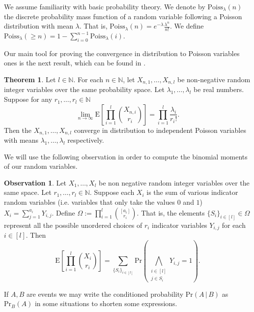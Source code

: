\documentclass[12pt,notitlepage,a4paper]{article}
\theoremstyle{definition}
\newtheorem{theorem}{Theorem}[section]
\newtheorem{obs}{Observation}[section]
\newcommand{\N}{\mathbb{N}}
\newcommand{\Ln}{\lim\limits_{n\to \infty}}
\begin{document}
We assume familiarity with basic probability theory. 
We denote by $\mathrm{Poiss}_\lambda(n)$ the discrete probability mass
function of a random variable following a Poisson distribution with
mean $\lambda$. That is, $\mathrm{Poiss}_\lambda(n)=e^{-\lambda}\frac{\lambda^n}{n!}$.
We define $\mathrm{Poiss}_\lambda(\geq n)=1 - \sum_{i=0}^{n-1} \mathrm{Poiss}_\lambda(i)$. \par

Our main tool for proving the convergence in distribution 
to Poisson variables ones is the next result, which can
be found in \cite[Theorem 1.23]{bollobas2001random}.


\begin{theorem} \label{thm:BrunSieve}
	Let $l\in \N$. For each 
	$n\in \N$, let $X_{n,1},\dots, X_{n,l}$ be non-negative
	random integer variables over the same
	probability space. Let $\lambda_1,\dots,\lambda_l$ 
	be real numbers. Suppose for any $r_1,\dots,r_l \in \N$
	\[ 
	\Ln \mathrm{E}\left[
	\prod_{i=1}^{l} \binom{X_{n,i}}{r_i} \right]
	= \prod_{i=1}^{l} \frac{\lambda_i}{r_i !}.	
	\]
	Then the $X_{n,1},\dots,X_{n,l}$ converge in distribution to
	independent Poisson variables with means $\lambda_1,\dots,\lambda_l$ 
	respectively. 
\end{theorem}

We will use the following observation in order to compute the binomial moments of 
our random variables.

\begin{obs} \label{obs:binomialmean} Let $X_1,\dots, X_l$ be non negative
	random integer variables over the same space. 
	Let $r_1,\dots,r_l\in \N$.	Suppose
	each $X_i$ is the sum of various indicator random variables
	(i.e. variables that only take the values $0$ and $1$)
	$X_i=\sum_{j=1}^{a_i} Y_{i,j}$. Define 
	$\Omega:=\prod_{i=1}^l \binom{[a_i]}{r_i}$. That is,
	the elements $\{S_i\}_{i\in[l]}\in \Omega$
	represent all the possible unordered choices of 
	$r_i$ indicator variables $Y_{i,j}$ for each $i\in [l]$.
	Then 
	\[
	\mathrm{E}\left[
	\prod_{i=1}^{l} \binom{X_i}{r_i}\right]=
	\sum_{\{S_i\}_{i\in [l]}} \mathrm{Pr}\left(
	\bigwedge_{\substack{i\in [l]\\ j\in S_i}} Y_{i,j}=1
	\right).	
	\]
\end{obs} 

If $A,B$ are events we may write the conditioned probability $\mathrm{Pr}(A\, | \, B )$ 
as $\mathrm{Pr}_B(A)$ in some situations to shorten some expressions. 
\end{document}
